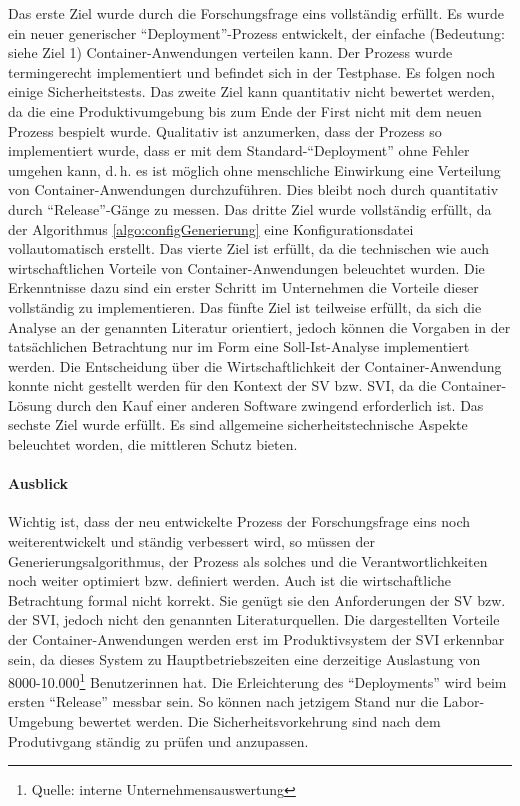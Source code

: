 Das erste Ziel wurde durch die Forschungsfrage eins vollständig erfüllt. Es wurde ein neuer generischer \enquote{Deployment}-Prozess entwickelt, der einfache (Bedeutung: siehe Ziel 1) Container-Anwendungen verteilen kann. Der Prozess wurde termingerecht implementiert und befindet sich in der Testphase. Es folgen noch einige Sicherheitstests. Das zweite Ziel kann quantitativ nicht bewertet werden, da die eine Produktivumgebung bis zum Ende der First nicht mit dem neuen Prozess bespielt wurde. Qualitativ ist anzumerken, dass der Prozess so implementiert wurde, dass er mit dem Standard-\enquote{Deployment} ohne Fehler umgehen kann, d.\,h. es ist möglich ohne menschliche Einwirkung eine Verteilung von Container-Anwendungen durchzuführen. Dies bleibt noch durch quantitativ durch \enquote{Release}-Gänge zu messen. Das dritte Ziel wurde vollständig erfüllt, da der Algorithmus \vref{algo:configGenerierung} eine Konfigurationsdatei vollautomatisch erstellt. Das vierte Ziel ist erfüllt, da die technischen wie auch wirtschaftlichen Vorteile von Container-Anwendungen beleuchtet wurden. Die Erkenntnisse dazu sind ein erster Schritt im Unternehmen die Vorteile dieser vollständig zu implementieren. Das fünfte Ziel ist teilweise erfüllt, da sich die Analyse an der genannten Literatur orientiert, jedoch können die Vorgaben in der tatsächlichen Betrachtung nur im Form eine Soll-Ist-Analyse implementiert werden. Die Entscheidung über die Wirtschaftlichkeit der Container-Anwendung konnte nicht gestellt werden für den Kontext der \ac{SV} bzw. \ac{SVI}, da die Container-Lösung durch den Kauf einer anderen Software zwingend erforderlich ist. Das sechste Ziel wurde erfüllt. Es sind allgemeine sicherheitstechnische Aspekte beleuchtet worden, die mittleren Schutz bieten.  
\paragraph{Ausblick}
Wichtig ist, dass der neu entwickelte Prozess der Forschungsfrage eins noch weiterentwickelt und ständig verbessert wird, so müssen der Generierungsalgorithmus, der Prozess als solches und die Verantwortlichkeiten noch weiter optimiert bzw. definiert werden. Auch ist die wirtschaftliche Betrachtung formal nicht korrekt. Sie genügt sie den Anforderungen der \ac{SV} bzw. der \ac{SVI}, jedoch nicht den genannten Literaturquellen. Die dargestellten Vorteile der Container-Anwendungen werden erst im Produktivsystem der \ac{SVI} erkennbar sein, da dieses System zu Hauptbetriebszeiten eine derzeitige Auslastung von 8000-10.000\footnote{Quelle: interne Unternehmensauswertung} Benutzerinnen hat. Die Erleichterung des \enquote{Deployments} wird beim ersten \enquote{Release} messbar sein. So können nach jetzigem Stand nur die Labor-Umgebung bewertet werden. Die Sicherheitsvorkehrung sind nach dem Produtivgang ständig zu prüfen und anzupassen.

